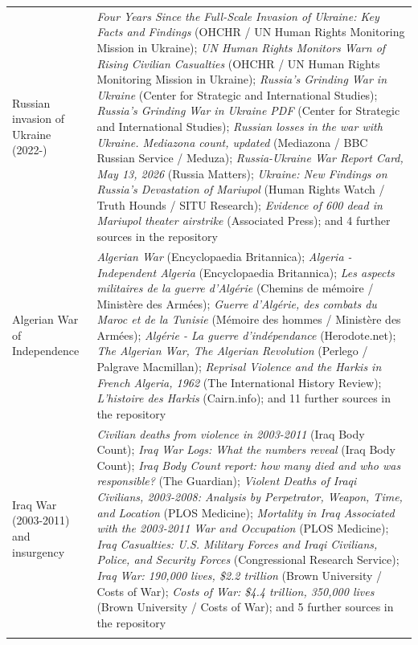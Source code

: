 \documentclass[11pt]{article}
\begin{document}
\begin{scriptsize}
\begin{longtable}{p{3.5cm} p{12.5cm}}
\addlinespace
Russian invasion of Ukraine (2022-) & \emph{Four Years Since the Full-Scale Invasion of Ukraine: Key Facts and Findings} (OHCHR / UN Human Rights Monitoring Mission in Ukraine); \emph{UN Human Rights Monitors Warn of Rising Civilian Casualties} (OHCHR / UN Human Rights Monitoring Mission in Ukraine); \emph{Russia's Grinding War in Ukraine} (Center for Strategic and International Studies); \emph{Russia's Grinding War in Ukraine PDF} (Center for Strategic and International Studies); \emph{Russian losses in the war with Ukraine. Mediazona count, updated} (Mediazona / BBC Russian Service / Meduza); \emph{Russia-Ukraine War Report Card, May 13, 2026} (Russia Matters); \emph{Ukraine: New Findings on Russia's Devastation of Mariupol} (Human Rights Watch / Truth Hounds / SITU Research); \emph{Evidence of 600 dead in Mariupol theater airstrike} (Associated Press); and 4 further sources in the repository \\
\addlinespace
Algerian War of Independence & \emph{Algerian War} (Encyclopaedia Britannica); \emph{Algeria - Independent Algeria} (Encyclopaedia Britannica); \emph{Les aspects militaires de la guerre d'Algérie} (Chemins de mémoire / Ministère des Armées); \emph{Guerre d'Algérie, des combats du Maroc et de la Tunisie} (Mémoire des hommes / Ministère des Armées); \emph{Algérie - La guerre d'indépendance} (Herodote.net); \emph{The Algerian War, The Algerian Revolution} (Perlego / Palgrave Macmillan); \emph{Reprisal Violence and the Harkis in French Algeria, 1962} (The International History Review); \emph{L'histoire des Harkis} (Cairn.info); and 11 further sources in the repository \\
\addlinespace
Iraq War (2003-2011) and insurgency & \emph{Civilian deaths from violence in 2003-2011} (Iraq Body Count); \emph{Iraq War Logs: What the numbers reveal} (Iraq Body Count); \emph{Iraq Body Count report: how many died and who was responsible?} (The Guardian); \emph{Violent Deaths of Iraqi Civilians, 2003-2008: Analysis by Perpetrator, Weapon, Time, and Location} (PLOS Medicine); \emph{Mortality in Iraq Associated with the 2003-2011 War and Occupation} (PLOS Medicine); \emph{Iraq Casualties: U.S. Military Forces and Iraqi Civilians, Police, and Security Forces} (Congressional Research Service); \emph{Iraq War: 190,000 lives, \$2.2 trillion} (Brown University / Costs of War); \emph{Costs of War: \$4.4 trillion, 350,000 lives} (Brown University / Costs of War); and 5 further sources in the repository \\
\addlinespace

\end{longtable}
\end{scriptsize}
\end{document}
